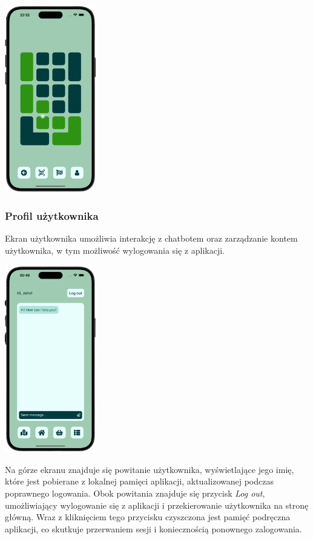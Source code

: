 \begin{center}
    \includegraphics[width=0.3\textwidth]{images/front/navigation_moved.png}
\end{center}

\subsubsection{Profil użytkownika}

Ekran użytkownika umożliwia interakcję z chatbotem oraz zarządzanie kontem użytkownika, w tym możliwość wylogowania się z aplikacji.

\begin{center}
    \includegraphics[width=0.3\textwidth]{images/front/user_page.png}
\end{center}

Na górze ekranu znajduje się powitanie użytkownika, wyświetlające jego imię, które jest pobierane z lokalnej pamięci aplikacji, aktualizowanej podczas poprawnego logowania. Obok powitania znajduje się przycisk \textit{Log out}, umożliwiający wylogowanie się z aplikacji i przekierowanie użytkownika na stronę główną. Wraz z kliknięciem tego przycisku czyszczona jest pamięć podręczna aplikacji, co skutkuje przerwaniem sesji i koniecznością ponownego zalogowania.

